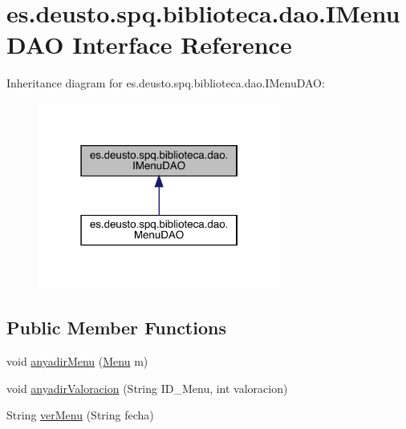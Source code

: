 \hypertarget{interfacees_1_1deusto_1_1spq_1_1biblioteca_1_1dao_1_1_i_menu_d_a_o}{}\section{es.\+deusto.\+spq.\+biblioteca.\+dao.\+I\+Menu\+D\+AO Interface Reference}
\label{interfacees_1_1deusto_1_1spq_1_1biblioteca_1_1dao_1_1_i_menu_d_a_o}


Inheritance diagram for es.\+deusto.\+spq.\+biblioteca.\+dao.\+I\+Menu\+D\+AO\+:
\nopagebreak
\begin{figure}[H]
\begin{center}
\leavevmode
\includegraphics[width=226pt]{interfacees_1_1deusto_1_1spq_1_1biblioteca_1_1dao_1_1_i_menu_d_a_o__inherit__graph}
\end{center}
\end{figure}
\subsection*{Public Member Functions}
\begin{DoxyCompactItemize}
\item 
void \mbox{\hyperlink{interfacees_1_1deusto_1_1spq_1_1biblioteca_1_1dao_1_1_i_menu_d_a_o_a1c99a228f8d92ef41cbd3c4aae426eb0}{anyadir\+Menu}} (\mbox{\hyperlink{classes_1_1deusto_1_1spq_1_1biblioteca_1_1data_1_1_menu}{Menu}} m)
\item 
void \mbox{\hyperlink{interfacees_1_1deusto_1_1spq_1_1biblioteca_1_1dao_1_1_i_menu_d_a_o_abd65ad2c5269cd19edc975518bf16b49}{anyadir\+Valoracion}} (String I\+D\+\_\+\+Menu, int valoracion)
\item 
String \mbox{\hyperlink{interfacees_1_1deusto_1_1spq_1_1biblioteca_1_1dao_1_1_i_menu_d_a_o_ac92176efdcf5f320225152392db8cb8a}{ver\+Menu}} (String fecha)
\end{DoxyCompactItemize}


